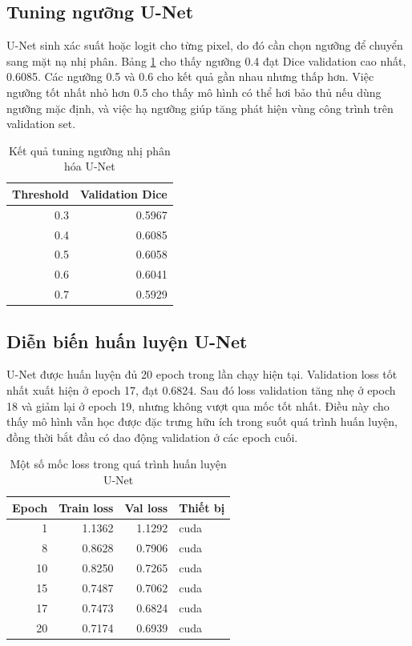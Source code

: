 \documentclass[12pt,a4paper]{report}
\begin{document}
\subsection{Tuning ngưỡng U-Net}

U-Net sinh xác suất hoặc logit cho từng pixel, do đó cần chọn ngưỡng để chuyển sang mặt nạ nhị phân. Bảng \ref{tab:unet-threshold} cho thấy ngưỡng 0.4 đạt Dice validation cao nhất, 0.6085. Các ngưỡng 0.5 và 0.6 cho kết quả gần nhau nhưng thấp hơn. Việc ngưỡng tốt nhất nhỏ hơn 0.5 cho thấy mô hình có thể hơi bảo thủ nếu dùng ngưỡng mặc định, và việc hạ ngưỡng giúp tăng phát hiện vùng công trình trên validation set.

\begin{table}[htbp]
\centering
\caption{Kết quả tuning ngưỡng nhị phân hóa U-Net}
\label{tab:unet-threshold}
\begin{tabular}{|r|r|}
\hline
\textbf{Threshold} & \textbf{Validation Dice}\\
\hline
0.3 & 0.5967\\
\hline
0.4 & 0.6085\\
\hline
0.5 & 0.6058\\
\hline
0.6 & 0.6041\\
\hline
0.7 & 0.5929\\
\hline
\end{tabular}
\end{table}

\subsection{Diễn biến huấn luyện U-Net}

U-Net được huấn luyện đủ 20 epoch trong lần chạy hiện tại. Validation loss tốt nhất xuất hiện ở epoch 17, đạt 0.6824. Sau đó loss validation tăng nhẹ ở epoch 18 và giảm lại ở epoch 19, nhưng không vượt qua mốc tốt nhất. Điều này cho thấy mô hình vẫn học được đặc trưng hữu ích trong suốt quá trình huấn luyện, đồng thời bắt đầu có dao động validation ở các epoch cuối.

\begin{table}[htbp]
\centering
\caption{Một số mốc loss trong quá trình huấn luyện U-Net}
\label{tab:unet-training}
\begin{tabular}{|r|r|r|l|}
\hline
\textbf{Epoch} & \textbf{Train loss} & \textbf{Val loss} & \textbf{Thiết bị}\\
\hline
1 & 1.1362 & 1.1292 & cuda\\
\hline
8 & 0.8628 & 0.7906 & cuda\\
\hline
10 & 0.8250 & 0.7265 & cuda\\
\hline
15 & 0.7487 & 0.7062 & cuda\\
\hline
17 & 0.7473 & 0.6824 & cuda\\
\hline
20 & 0.7174 & 0.6939 & cuda\\
\hline
\end{tabular}
\end{table}
\end{document}
